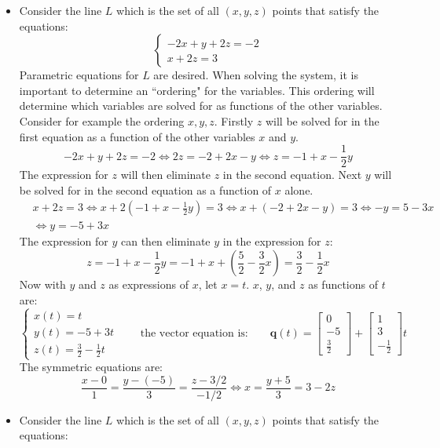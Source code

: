 \documentclass{article}
\begin{document}
\begin{itemize}
\item Consider the line \(L\) which is the set of all \((x,y,z)\) points that satisfy the equations:
\[\left\{\begin{array}{c}
-2x + y + 2z = -2 \\ 
x + 2z = 3
\end{array}\right.\]
Parametric equations for \(L\) are desired. When solving the system, it is important to determine an ``ordering" for the variables. This ordering will determine which variables are solved for as functions of the other variables. Consider for example the ordering \(x, y, z\). Firstly \(z\) will be solved for in the first equation as a function of the other variables \(x\) and \(y\). 
\[-2x + y + 2z = -2 \iff 2z = -2 + 2x - y \iff z = -1 + x - \frac{1}{2}y\]
The expression for \(z\) will then eliminate \(z\) in the second equation. Next \(y\) will be solved for in the second equation as a function of \(x\) alone.
\begin{align*}
& x + 2z = 3 \iff x + 2(-1 + x - \frac{1}{2}y) = 3 \iff x + (-2 + 2x - y) = 3 \iff -y = 5 - 3x \\
& \iff y = -5 + 3x
\end{align*}
The expression for \(y\) can then eliminate \(y\) in the expression for \(z\):
\[z = -1 + x - \frac{1}{2}y = -1 + x + (\frac{5}{2} - \frac{3}{2}x) = \frac{3}{2} - \frac{1}{2}x\]
Now with \(y\) and \(z\) as expressions of \(x\), let \(x = t\). \(x\), \(y\), and \(z\) as functions of \(t\) are:
\[\left\{\begin{array}{c}
x(t) = t \\ 
y(t) = -5 + 3t \\ 
z(t) = \frac{3}{2} - \frac{1}{2}t
\end{array}\right.
\quad\quad\text{the vector equation is:}\quad\quad
\mathbf{q}(t) = \begin{bmatrix} 0 \\ -5 \\ \frac{3}{2} \end{bmatrix} + \begin{bmatrix} 1 \\ 3 \\ -\frac{1}{2} \end{bmatrix}t\]
The symmetric equations are:
\[\frac{x - 0}{1} = \frac{y - (-5)}{3} = \frac{z - 3/2}{-1/2} \iff x = \frac{y + 5}{3} = 3 - 2z\]
\item Consider the line \(L\) which is the set of all \((x,y,z)\) points that satisfy the equations:

\end{itemize}
\end{document}
